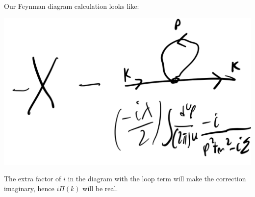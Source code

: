 Our Feynman diagram calculation looks like:

\begin{center}
\includegraphics[scale=0.3]{Images/fig-lec28feynman2.png}
\end{center}

The extra factor of $i$ in the diagram with the loop term will make the correction imaginary, hence $i\Pi(k)$ will be real.

